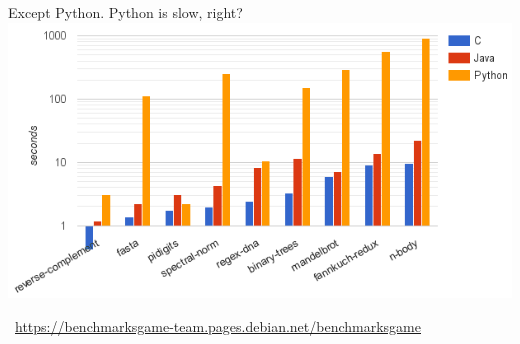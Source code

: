 \documentclass[aspectratio=169]{beamer}
\begin{document}
\begin{frame}{Except Python. Python is slow, right?}
\vspace{0.25 cm}
\includegraphics[width=\linewidth]{benchmark-games.png}

\vspace{-0.5 cm}
\mbox{ }\hfill\textcolor{blue}{\tiny \url{https://benchmarksgame-team.pages.debian.net/benchmarksgame}}\hfill\mbox{ }
\end{frame}
\end{document}
